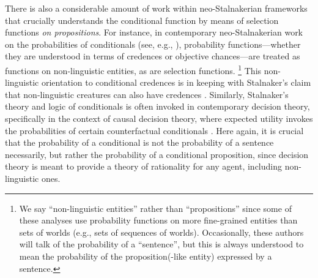 \documentclass[12pt]{article}
\begin{document}


There is also a considerable amount of work within neo-Stalnakerian frameworks that crucially understands the conditional function by means of selection functions \emph{on propositions}. 
For instance, in contemporary neo-Stalnakerian work on the probabilities of conditionals (see, e.g., \cite{Schulz2014,Schulz2017,Bacon2015,GoldsteinSantorio2021,Khoo2022,KhooMandelkern2019,Santorio2022,Santorio2025,Schultheis2023}), probability functions---whether they are understood in terms of credences or objective chances---are treated as functions on non-linguistic entities, as are selection functions.%
\footnote{
    We say ``non-linguistic entities'' rather than ``propositions'' since some of these analyses use probability functions on more fine-grained entities than sets of worlds (e.g., sets of sequences of worlds). 
    Occasionally, these authors will talk of the probability of a ``sentence'', but this is always understood to mean the probability of the proposition(-like entity) expressed by a sentence. 
    } %
This non-linguistic orientation to conditional credences is in keeping with Stalnaker's claim that non-linguistic creatures can also have credences \parencite{stalnaker1976propositions}. Similarly, Stalnaker's theory and logic of conditionals is often invoked in contemporary decision theory, specifically in the context of causal decision theory, where expected utility invokes the probabilities of certain counterfactual conditionals \parencite{GibbardHarper1978,Lewis1981,Joyce1999,Hedden2023,McNamara2024}.  
Here again, it is crucial that the probability of a conditional is not the probability of a sentence necessarily, but rather the probability of a conditional proposition, since decision theory is meant to provide a theory of rationality for any agent, including non-linguistic ones. 



\end{document}
